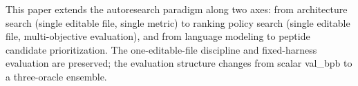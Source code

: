 This paper extends the autoresearch paradigm along two axes: from architecture search (single editable file, single metric) to ranking policy search (single editable file, multi-objective evaluation), and from language modeling to peptide candidate prioritization.
The one-editable-file discipline and fixed-harness evaluation are preserved; the evaluation structure changes from scalar val\_bpb to a three-oracle ensemble.
